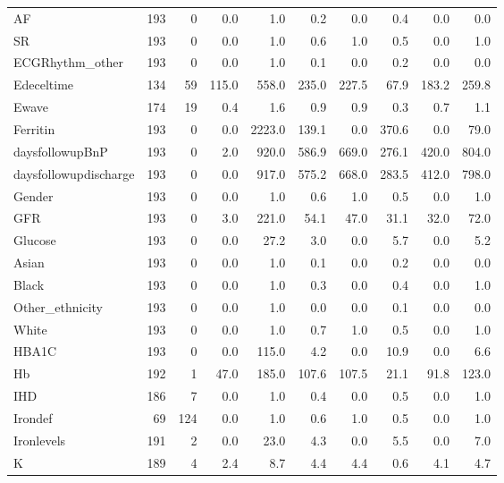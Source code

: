 \begin{footnotesize}
\begin{tabularx}{\textwidth}{P{2.4cm}RRRRRRRRR}
AF & 193 &   0 &   0.0 &     1.0 &    0.2 &    0.0 &    0.4 &   0.0 &    0.0 \\ 
SR & 193 &   0 &   0.0 &     1.0 &    0.6 &    1.0 &    0.5 &   0.0 &    1.0 \\ 
ECGRhythm\_other & 193 &   0 &   0.0 &     1.0 &    0.1 &    0.0 &    0.2 &   0.0 &    0.0 \\ 
Edeceltime & 134 &  59 & 115.0 &   558.0 &  235.0 &  227.5 &   67.9 & 183.2 &  259.8 \\ 
Ewave & 174 &  19 &   0.4 &     1.6 &    0.9 &    0.9 &    0.3 &   0.7 &    1.1 \\ 
Ferritin & 193 &   0 &   0.0 &  2223.0 &  139.1 &    0.0 &  370.6 &   0.0 &   79.0 \\ 
daysfollowupBnP & 193 &   0 &   2.0 &   920.0 &  586.9 &  669.0 &  276.1 & 420.0 &  804.0 \\ 
daysfollowupdischarge & 193 &   0 &   0.0 &   917.0 &  575.2 &  668.0 &  283.5 & 412.0 &  798.0 \\ 
Gender & 193 &   0 &   0.0 &     1.0 &    0.6 &    1.0 &    0.5 &   0.0 &    1.0 \\ 
GFR & 193 &   0 &   3.0 &   221.0 &   54.1 &   47.0 &   31.1 &  32.0 &   72.0 \\ 
Glucose & 193 &   0 &   0.0 &    27.2 &    3.0 &    0.0 &    5.7 &   0.0 &    5.2 \\ 
Asian & 193 &   0 &   0.0 &     1.0 &    0.1 &    0.0 &    0.2 &   0.0 &    0.0 \\ 
Black & 193 &   0 &   0.0 &     1.0 &    0.3 &    0.0 &    0.4 &   0.0 &    1.0 \\ 
Other\_ethnicity & 193 &   0 &   0.0 &     1.0 &    0.0 &    0.0 &    0.1 &   0.0 &    0.0 \\ 
White & 193 &   0 &   0.0 &     1.0 &    0.7 &    1.0 &    0.5 &   0.0 &    1.0 \\ 
HBA1C & 193 &   0 &   0.0 &   115.0 &    4.2 &    0.0 &   10.9 &   0.0 &    6.6 \\ 
Hb & 192 &   1 &  47.0 &   185.0 &  107.6 &  107.5 &   21.1 &  91.8 &  123.0 \\ 
IHD & 186 &   7 &   0.0 &     1.0 &    0.4 &    0.0 &    0.5 &   0.0 &    1.0 \\ 
Irondef &  69 & 124 &   0.0 &     1.0 &    0.6 &    1.0 &    0.5 &   0.0 &    1.0 \\ 
Ironlevels & 191 &   2 &   0.0 &    23.0 &    4.3 &    0.0 &    5.5 &   0.0 &    7.0 \\ 
K & 189 &   4 &   2.4 &     8.7 &    4.4 &    4.4 &    0.6 &   4.1 &    4.7 \\ 

\end{tabularx}
\end{footnotesize}
